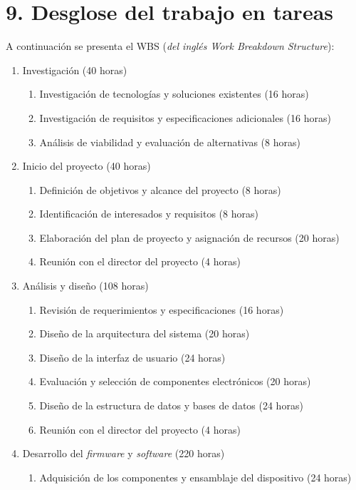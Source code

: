 \documentclass[
11pt, %
]{charter}
\begin{document}
\section{9. Desglose del trabajo en tareas}
\label{sec:wbs}

A continuación se presenta el WBS (\emph{del inglés Work Breakdown Structure}):

\begin{enumerate}
\item Investigación (40 horas)
	\begin{enumerate}	
	\item  Investigación de tecnologías y soluciones existentes (16 horas)
	\item  Investigación de requisitos y especificaciones adicionales (16 horas)
	\item  Análisis de viabilidad y evaluación de alternativas (8 horas)
	\end{enumerate}
\item Inicio del proyecto (40 horas)
	\begin{enumerate}
	\item Definición de objetivos y alcance del proyecto (8 horas)
	\item Identificación de interesados y requisitos (8 horas)
	\item Elaboración del plan de proyecto y asignación de recursos (20 horas)
	\item Reunión con el director del proyecto (4 horas)
	\end{enumerate}
\item Análisis y diseño (108 horas)
	\begin{enumerate}
	\item Revisión de requerimientos y especificaciones (16 horas)
	\item Diseño de la arquitectura del sistema (20 horas)
	\item Diseño de la interfaz de usuario (24 horas)
	\item Evaluación y selección de componentes electrónicos (20 horas)
	\item Diseño de la estructura de datos y bases de datos (24 horas)
	\item Reunión con el director del proyecto (4 horas)
	\end{enumerate}
\item Desarrollo del \emph{firmware} y \emph{software} (220 horas)
	\begin{enumerate}
	\item Adquisición de los componentes y ensamblaje del dispositivo (24 horas)

\end{enumerate}
\end{enumerate}
\end{document}
